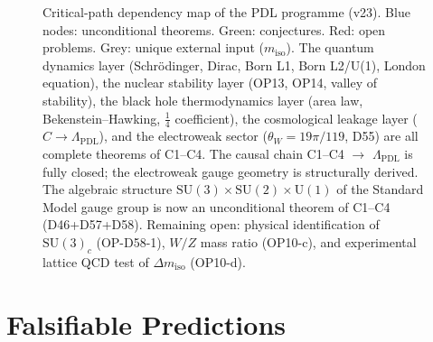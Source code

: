 \documentclass[11pt,a4paper]{article}
\theoremstyle{plain}
\theoremstyle{definition}
\theoremstyle{remark}
\begin{document}
\begin{figure}[H]
{%
}
\caption{Critical-path dependency map of the PDL programme (v23). \textcolor{proofblue}{Blue nodes}: unconditional theorems. \textcolor{conjecturegreen}{Green}: conjectures. \textcolor{openproblemred}{Red}: open problems. Grey: unique external input ($m_{\mathrm{iso}}$). The quantum dynamics layer (Schr\"odinger, Dirac, Born L1, Born L2/U(1), London equation), the nuclear stability layer (OP13, OP14, valley of stability), the black hole thermodynamics layer (area law, Bekenstein--Hawking, $\tfrac{1}{4}$ coefficient), the cosmological leakage layer ($C \to \Lambda_{\mathrm{PDL}}$), and the electroweak sector ($\theta_W = 19\pi/119$, D55) are all complete theorems of C1--C4. The causal chain C1--C4 $\to$ $\Lambda_{\mathrm{PDL}}$ is fully closed; the electroweak gauge geometry is structurally derived. The algebraic structure $\mathrm{SU}(3)\times\mathrm{SU}(2)\times\mathrm{U}(1)$ of the Standard Model gauge group is now an unconditional theorem of C1--C4 (D46+D57+D58). Remaining open: physical identification of $\mathrm{SU}(3)_c$ (OP-D58-1), $W/Z$ mass ratio (OP10-c), and experimental lattice QCD test of $\Delta m_{\mathrm{iso}}$ (OP10-d).}
\label{fig:dependency}
\end{figure}

\newpage

\section{Falsifiable Predictions}
\label{sec:predictions}
\end{document}
